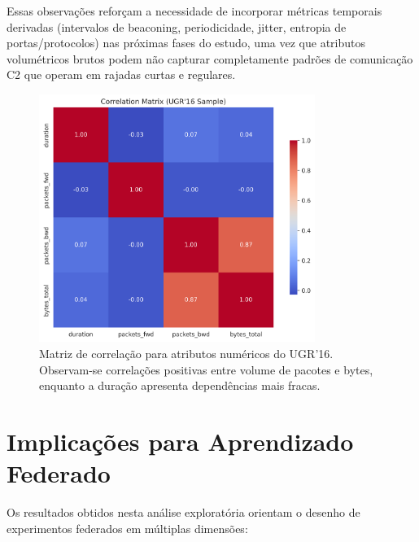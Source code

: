 \documentclass[a4paper, 12pt]{article}
\begin{document}
Essas observações reforçam a necessidade de incorporar métricas temporais derivadas (intervalos de beaconing, periodicidade, jitter, entropia de portas/protocolos) nas próximas fases do estudo, uma vez que atributos volumétricos brutos podem não capturar completamente padrões de comunicação C2 que operam em rajadas curtas e regulares.

\begin{figure}[H]
    \centering
    \includegraphics[width=0.80\textwidth]{ugr16_numeric_correlation.png}
    \caption{Matriz de correlação para atributos numéricos do UGR'16. Observam-se correlações positivas entre volume de pacotes e bytes, enquanto a duração apresenta dependências mais fracas.}
    \label{fig:ugr16_numeric_correlation}
\end{figure}

\section{Implicações para Aprendizado Federado}
Os resultados obtidos nesta análise exploratória orientam o desenho de experimentos federados em múltiplas dimensões:
\end{document}
